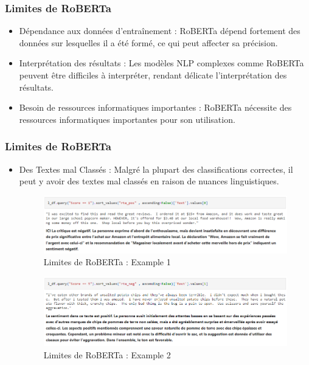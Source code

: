 \begin{frame}
    \frametitle{Limites de RoBERTa}
    \begin{itemize}
        \item Dépendance aux données d'entraînement : RoBERTa dépend fortement des données sur lesquelles il a été formé, ce qui peut affecter sa précision.
        \item Interprétation des résultats : Les modèles NLP complexes comme RoBERTa peuvent être difficiles à interpréter, rendant délicate l'interprétation des résultats.
        \item Besoin de ressources informatiques importantes : RoBERTa nécessite des ressources informatiques importantes pour son utilisation.
    \end{itemize}
\end{frame}
\begin{frame}
    \frametitle{Limites de RoBERTa}
    \begin{itemize}
    
        \item Des Textes mal Classés : Malgré la plupart des classifications correctes, il peut y avoir des textes mal classés en raison de nuances linguistiques.
        
        \begin{figure}[h]
            \centering
            \includegraphics[scale=0.4]{Figures/pointsfaible1.png}
            \caption{Limites de RoBERTa : Example 1 }
            \label{fig:Limit1RoBERTa}
        \end{figure}

        \begin{figure}[h]
            \centering
            \includegraphics[scale=0.3]{Figures/pointsfaible2.png}
            \caption{Limites de RoBERTa : Example 2 }
            \label{fig:Limit2RoBERTa}
        \end{figure}
        
    \end{itemize}
\end{frame}

